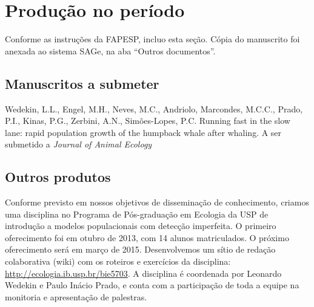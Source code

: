 \documentclass[12pt, A4]{article}
\begin{document}
\section{Produção no período} 
Conforme as instruções da FAPESP, incluo esta seção. 
Cópia do manuscrito foi anexada ao sistema SAGe, na aba ``Outros documentos''.

\subsection{Manuscritos a submeter}
\label{sec:manuscritos-submeter}
Wedekin, L.L., Engel, M.H., Neves, M.C., Andriolo, Marcondes, M.C.C., Prado, P.I., Kinas, P.G., Zerbini, A.N., 
Simões-Lopes, P.C. Running fast in the slow lane: rapid population growth of the humpback whale after whaling. A ser submetido a \emph{Journal of Animal Ecology}

\subsection{Outros produtos}
\label{sec:outros-produtos}

Conforme previsto em nossos objetivos de disseminação de conhecimento, 
criamos uma disciplina no Programa de Pós-graduação em Ecologia da USP de introdução
a modelos populacionais com detecção imperfeita. O primeiro oferecimento foi em otubro de 2013,
com 14 alunos matriculados. O próximo oferecimento será em março de 2015. 
Desenvolvemos um sítio de redação colaborativa (wiki) com os roteiros e exercícios da disciplina: 
\url{http://ecologia.ib.usp.br/bie5703}. A disciplina é coordenada por Leonardo Wedekin e Paulo Inácio Prado,
e conta com a participação de toda a equipe na monitoria e apresentação de palestras.



\end{document}
